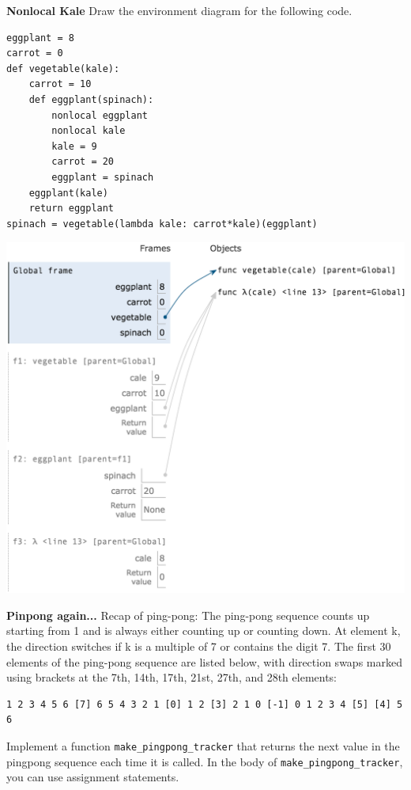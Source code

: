 \documentclass{exam}
\begin{document}
\begin{questions}

\begin{blocksection}
\question \textbf{Nonlocal Kale} \newline
Draw the environment diagram for the following code.

\begin{lstlisting}
eggplant = 8
carrot = 0
def vegetable(kale):
    carrot = 10
    def eggplant(spinach):
        nonlocal eggplant
        nonlocal kale
        kale = 9
        carrot = 20
        eggplant = spinach
    eggplant(kale)
    return eggplant
spinach = vegetable(lambda kale: carrot*kale)(eggplant)
\end{lstlisting}

\begin{solution}[3in]
	\includegraphics[scale=0.5]{img/kale.png}
\end{solution}

\end{blocksection}

\begin{blocksection}
\question \textbf{Pinpong again...}  \newline
Recap of ping-pong: The ping-pong sequence counts up starting from 1 and is always either counting up or counting down. At element k, the direction switches if k is a multiple of 7 or contains the digit 7. The first 30 elements of the ping-pong sequence are listed below, with direction swaps marked using brackets at the 7th, 14th, 17th, 21st, 27th, and 28th elements:
\begin{lstlisting}
1 2 3 4 5 6 [7] 6 5 4 3 2 1 [0] 1 2 [3] 2 1 0 [-1] 0 1 2 3 4 [5] [4] 5 6
\end{lstlisting}
Implement a function \texttt{make\_pingpong\_tracker} that returns the next value in the pingpong sequence each time it is called.  In the body of \texttt{make\_pingpong\_tracker}, you can use assignment statements.
\newline


\end{blocksection}
\end{questions}
\end{document}
